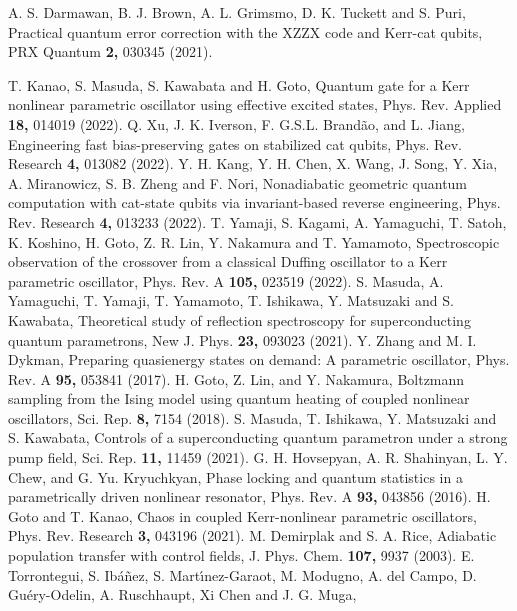 \documentclass[%
 reprint,
 amsmath,amssymb,
 aps,
pra,
]{revtex4-2}
\begin{document}
\begin{thebibliography}{99}
 A. S. Darmawan, B. J. Brown, A. L. Grimsmo, D. K. Tuckett and S. Puri, 
Practical quantum error correction with the XZZX code and Kerr-cat qubits,
{PRX Quantum} {\bf 2,} 030345 (2021).

 T. Kanao, S. Masuda, S. Kawabata and H. Goto, 
Quantum gate for a Kerr nonlinear parametric oscillator using effective excited states,
Phys. Rev. Applied {\bf 18,} 014019 (2022).
 Q. Xu, J. K. Iverson, F. G.S.L. Brand\~{a}o, and L. Jiang, 
Engineering fast bias-preserving gates on stabilized cat qubits,
{Phys. Rev. Research} {\bf 4,} 013082 (2022).
Y. H. Kang, Y. H. Chen, X. Wang, J. Song, Y. Xia, A. Miranowicz, S. B. Zheng and F. Nori, 
Nonadiabatic geometric quantum computation with cat-state qubits via invariant-based reverse engineering,
Phys. Rev. Research {\bf 4,} 013233 (2022).
 T. Yamaji, S. Kagami, A. Yamaguchi, T. Satoh, K. Koshino, H. Goto, Z. R. Lin, Y. Nakamura and  T. Yamamoto, 
Spectroscopic observation of the crossover from a classical Duffing oscillator to a Kerr parametric oscillator,
Phys. Rev. A {\bf 105,} 023519 (2022).
 S. Masuda, A. Yamaguchi, T. Yamaji, T. Yamamoto, T. Ishikawa, Y. Matsuzaki and S. Kawabata, 
Theoretical study of reflection spectroscopy for superconducting quantum parametrons,
New J. Phys. {\bf 23,} 093023 (2021).
 Y. Zhang and M. I. Dykman, 
Preparing quasienergy states on demand: A parametric oscillator,
{Phys. Rev.} A {\bf 95,} 053841 (2017).
 H. Goto, Z. Lin, and Y. Nakamura, 
Boltzmann sampling from the Ising model using quantum heating of coupled nonlinear oscillators,
Sci. Rep. {\bf 8,} 7154 (2018).
 S. Masuda, T. Ishikawa, Y. Matsuzaki and S. Kawabata, 
Controls of a superconducting quantum parametron under a strong pump field,
{Sci. Rep.} {\bf 11,} 11459 (2021).
 G. H. Hovsepyan, A. R. Shahinyan, L. Y. Chew, and G. Yu. Kryuchkyan,
Phase locking and quantum statistics in a parametrically driven nonlinear resonator,
Phys. Rev. A {\bf 93,} 043856 (2016).
 H. Goto and T. Kanao, 
Chaos in coupled Kerr-nonlinear parametric oscillators,
Phys. Rev. Research {\bf 3,} 043196 (2021).
  M. Demirplak and S. A. Rice, 
Adiabatic population transfer with control fields,
J. Phys. Chem. {\bf 107,} 9937 (2003).
 E. Torrontegui, S. Ib\'{a}\~{n}ez, S. Mart\'{\i}nez-Garaot, M. Modugno, A. del Campo, D. Gu\'ery-Odelin, A. Ruschhaupt, Xi Chen and J. G. Muga, 

\end{thebibliography}
\end{document}
